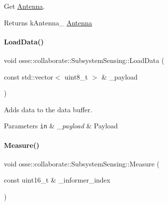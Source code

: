 Get \hyperlink{classosse_1_1collaborate_1_1_antenna}{Antenna}. 

\begin{DoxyReturn}{Returns}
k\+Antenna\+\_\+ \hyperlink{classosse_1_1collaborate_1_1_antenna}{Antenna} 
\end{DoxyReturn}
\mbox{\label{classosse_1_1collaborate_1_1_subsystem_sensing_aca7bea84c4184675d161c698ec0318a9}} 
\paragraph{\texorpdfstring{Load\+Data()}{LoadData()}}
{\footnotesize\ttfamily void osse\+::collaborate\+::\+Subsystem\+Sensing\+::\+Load\+Data (\begin{DoxyParamCaption}\item[{const std\+::vector$<$ uint8\+\_\+t $>$ \&}]{\+\_\+payload }\end{DoxyParamCaption})}



Adds data to the data buffer. 


\begin{DoxyParams}[1]{Parameters}
\mbox{\tt in}  & {\em \+\_\+payload} & Payload \\
\hline
\end{DoxyParams}
\mbox{\label{classosse_1_1collaborate_1_1_subsystem_sensing_a7ab0187c0ebdf98d98190c5cbeff49b2}} 
\paragraph{\texorpdfstring{Measure()}{Measure()}}
{\footnotesize\ttfamily void osse\+::collaborate\+::\+Subsystem\+Sensing\+::\+Measure (\begin{DoxyParamCaption}\item[{const uint16\+\_\+t \&}]{\+\_\+informer\+\_\+index }\end{DoxyParamCaption})}



